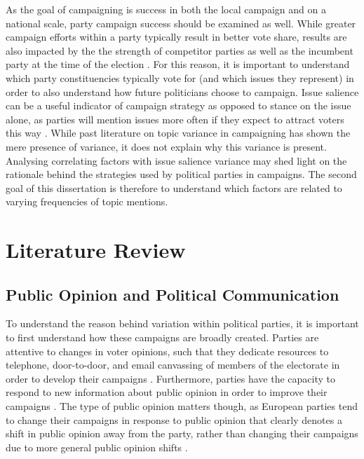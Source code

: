 \documentclass[12pt,letterpaper]{article}
\begin{document}
As the goal of campaigning is success in both the local campaign and on a national scale, party campaign success should be examined as well. While greater campaign efforts within a party typically result in better vote share, results are also impacted by the the strength of competitor parties as well as the incumbent party at the time of the election \autocite{pattieIncumbentPartiesIncumbent2017a}. For this reason, it is important to understand which party constituencies typically vote for (and which issues they represent) in order to also understand how future politicians choose to campaign. Issue salience can be a useful indicator of campaign strategy as opposed to stance on the issue alone, as parties will mention issues more often if they expect to attract voters this way \autocite{pogorelisIssueSalienceRegional2005}. While past literature on topic variance in campaigning has shown the mere presence of variance, it does not explain why this variance is present. Analysing correlating factors with issue salience variance may shed light on the rationale behind the strategies used by political parties in campaigns. The second goal of this dissertation is therefore to understand which factors are related to varying frequencies of topic mentions. 



\section{Literature Review}

\subsection{Public Opinion and Political Communication}

To understand the reason behind variation within political parties, it is important to first understand how these campaigns are broadly created. Parties are attentive to changes in voter opinions, such that they dedicate resources to telephone, door-to-door, and email canvassing of members of the electorate in order to develop their campaigns \autocite{fisherFootsloggingCallCentres2008}. Furthermore, parties have the capacity to respond to new information about public opinion in order to improve their campaigns \autocite{hartmanLearningJobAdapting2017}. The type of public opinion matters though, as European parties tend to change their campaigns in response to public opinion that clearly denotes a shift in public opinion away from the party, rather than changing their campaigns due to more general public opinion shifts \autocite{adamsUnderstandingChangeStability2004}. 
\end{document}
